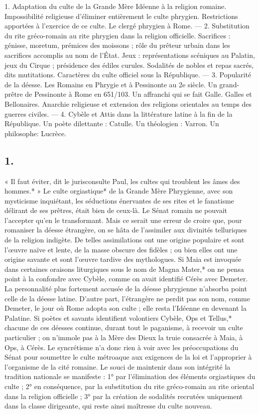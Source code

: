 \documentclass[a4paper, 11pt, oneside, polutonikogreek, french]{article}
\begin{document}
1. Adaptation du culte de la Grande Mère Idéenne à la religion romaine. Impossibilité religieuse d'éliminer entièrement le culte phrygien. Restrictions apportées à l'exercice de ce culte. Le clergé phrygien à Rome. --- 2. Substitution du rite gréco-romain au rite phrygien dans la religion officielle. Sacrifices : génisse, moretum, prémices des moissons ; rôle du prêteur urbain dans les sacrifices accomplis au nom de l'État. Jeux : représentations scéniques au Palatin, jeux du Cirque ; présidence des édiles curules. Sodalités de nobles et repas sacrés, dits mutitations. Caractères du culte officiel sous la République. --- 3. Popularité de la déesse. Les Romains en Phrygie et à Pessinonte au 2e siècle. Un grand-prêtre de Pessinonte à Rome en 651/103. Un affranchi qui se fait Galle. Galles et Bellonaires. Anarchie religieuse et extension des religions orientales au temps des guerres civiles. --- 4. Cybèle et Attis dans la littérature latine à la fin de la République. Un poète dilettante : Catulle. Un théologien : Varron. Un philosophe: Lucrèce.

\subsection{1.}

« Il faut éviter, dit le jurisconsulte Paul, les cultes qui troublent les âmes des hommes.* » Le culte orgiastique* de la Grande Mère Phrygienne, avec son mysticisme inquiétant, les séductions énervantes de ses rites et le fanatisme délirant de ses prêtres, était bien de ceux-là. Le Sénat romain ne pouvait l'accepter qu'en le transformant. Mais ce serait une erreur de croire que, pour romaniser la déesse étrangère, on se hâta de l'assimiler aux divinités telluriques de la religion indigète. De telles assimilations ont une origine populaire et sont l'œuvre naïve et lente, de la masse obscure des fidèles ; ou bien elles ont une origine savante et sont l'œuvre tardive des mythologues. Si Maia est invoquée dans certaines oraisons liturgiques sous le nom de Magna Mater,* on ne pensa point à la confondre avec Cybèle, comme on avait identifié Cérès avec Demeter. La personnalité plus fortement accusée de la déesse phrygienne n'absorba point celle de la déesse latine. D'autre part, l'étrangère ne perdit pas son nom, comme Demeter, le jour où Rome adopta son culte ; elle resta l'Idéenne en devenant la Palatine. Si poètes et savants identifient volontiers Cybèle, Ops et Tellus,* chacune de ces déesses continue, durant tout le paganisme, à recevoir un culte particulier ; on n'immole pas à la Mère des Dieux la truie consacrée à Maia, à Ops, à Cérès. Le syncrétisme n'a donc rien à voir avec les préoccupations du Sénat pour soumettre le culte métroaque aux exigences de la loi et l'approprier à l'organisme de la cité romaine. Le souci de maintenir dans son intégrité la tradition nationale se manifeste : 1° par l'élimination des éléments orgiastiques du culte ; 2° en conséquence, par la substitution du rite gréco-romain au rite oriental dans la religion officielle ; 3° par la création de sodalités recrutées uniquement dans la classe dirigeante, qui reste ainsi maîtresse du culte nouveau.
\end{document}
